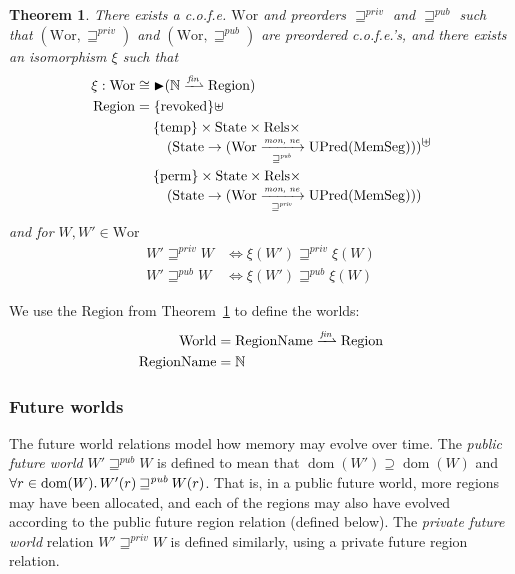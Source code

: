 \documentclass[compsoc,conference,letterpaper,fleqn]{IEEEtran}
\newtheorem{theorem}{Theorem}
\newcommand{\finparfun}{\xrightharpoonup{\textit{\tiny{fin}}}}
\newcommand{\fun}{\rightarrow}
\DeclareMathOperator{\dom}{dom}
\newcommand{\blater}{\mathop{\blacktriangleright}}
\newcommand{\cofe}{c.o.f.e.}
\newcommand{\cofes}{\cofe{}'s}
\newcommand{\var}[1]{\mathit{#1}}
\newcommand{\futurewk}{\mathbin{\sqsupseteq}^{\var{pub}}}
\newcommand{\futurestr}{\mathbin{\sqsupseteq}^{\var{priv}}}
\newcommand{\monwknefun}{\xrightarrow[\text{\tiny{$\futurewk$}}]{\textit{\tiny{mon, ne}}}}
\newcommand{\monstrnefun}{\xrightarrow[\text{\tiny{$\futurestr$}}]{\textit{\tiny{mon, ne}}}}
\newcommand{\plaindom}[1]{\mathrm{#1}}
\newcommand{\HeapSegments}{\plaindom{MemSeg}}
\newcommand{\nats}{\mathbb{N}}
\newcommand{\Rels}{\plaindom{Rels}}
\newcommand{\States}{\plaindom{State}}
\newcommand{\RegionNames}{\plaindom{RegionName}}
\newcommand{\Regions}{\plaindom{Region}}
\newcommand{\Worlds}{\plaindom{World}}
\newcommand{\Wor}{\plaindom{Wor}}
\newcommand{\UPred}[1]{\plaindom{UPred}(#1)}
\newcommand{\plainview}[1]{\mathrm{#1}}
\newcommand{\perma}{\plainview{perm}}
\newcommand{\temp}{\plainview{temp}}
\newcommand{\revoked}{\plainview{revoked}}
\begin{document}
\begin{theorem}\label{thm:world-existence}
  There exists a \cofe{} $\Wor$ and preorders $\futurestr$ and
  $\futurewk$ such that $(\Wor,\futurestr)$ and $(\Wor,\futurewk)$ are
  preordered \cofes{}, and there exists an isomorphism $\xi$ such that
  {\small
    \begin{align*}              
      \xi : \Wor & \cong \blater (\nats \finparfun \Regions)\\
      \Regions & = \{\revoked\} \uplus \\
                 &\;\quad \begin{multlined}
                     \{\temp\} \times \States \times \Rels \times \\
                     (\States \fun (\Wor \monwknefun \UPred{\HeapSegments}))
                   \end{multlined} \uplus \\
                 &\;\quad \begin{multlined}
                     \{\perma\} \times \States \times \Rels \times \\
                     (\States \fun (\Wor \monstrnefun \UPred{\HeapSegments}))
                   \end{multlined}
    \end{align*}
  } and for $W, W' \in \Wor$
  \begin{align*}
    W' \futurestr W & \Leftrightarrow \xi(W') \futurestr \xi(W)   \\
    W' \futurewk W & \Leftrightarrow \xi(W') \futurewk \xi(W)
  \end{align*}
\end{theorem}
We use the $\Regions$ from Theorem~\ref{thm:world-existence} to define
the worlds:
\begin{align*}
  \Worlds & = \RegionNames \finparfun \Regions\\
 \RegionNames & = \nats
\end{align*}

\subsubsection{Future worlds}
The future world relations model how memory may evolve over time. 
The \emph{public future world} 
$W' \futurewk W$ is defined to mean that $\dom(W') \supseteq \dom(W)$
and $\forall r \in \dom(W) \ldotp W'(r) \futurewk W(r)$.  That is,
in a public future world, more regions may have been allocated, and
each of the regions may also have evolved according to the public future
region relation (defined below). The \emph{private future world} relation
$W' \futurestr W$ is defined similarly, using a private future region
relation.
\end{document}
